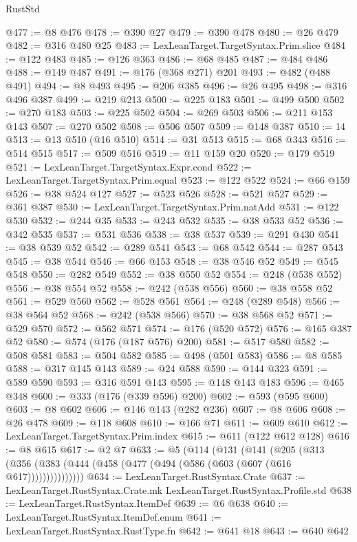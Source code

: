 \begin{lexlean}{RustStd}
\begin{coremodule}
@477 := @8 @476
@478 := @390 @27
@479 := @390 @478
@480 := @26 @479
@482 := @316 @480 @25
@483 := LexLeanTarget.TargetSyntax.Prim.slice
@484 := @122 @483
@485 := @126 @363
@486 := @68 @485
@487 := @484 @486
@488 := @149 @487
@491 := @176 (@368 @271) @201
@493 := @482 (@488 @491)
@494 := @8 @493
@495 := @206 @385
@496 := @26 @495
@498 := @316 @496 @387
@499 := @219 @213
@500 := @225 @183
@501 := @499 @500
@502 := @270 @183
@503 := @225 @502
@504 := @269 @503
@506 := @211 @153 @143
@507 := @270 @502
@508 := @506 @507
@509 := @148 @387
@510 := 14
@513 := @13 @510 (@16 @510)
@514 := @31 @513
@515 := @68 @343
@516 := @514 @515
@517 := @509 @516
@519 := @11 @159 @20
@520 := @179 @519
@521 := LexLeanTarget.TargetSyntax.Expr.cond
@522 := LexLeanTarget.TargetSyntax.Prim.equal
@523 := @122 @522
@524 := @66 @159
@526 := @38 @524 @127
@527 := @523 @526
@528 := @521 @527
@529 := @361 @387
@530 := LexLeanTarget.TargetSyntax.Prim.natAdd
@531 := @122 @530
@532 := @244 @35
@533 := @243 @532
@535 := @38 @533 @52
@536 := @342 @535
@537 := @531 @536
@538 := @38 @537
@539 := @291 @430
@541 := @38 @539 @52
@542 := @289 @541
@543 := @68 @542
@544 := @287 @543
@545 := @38 @544
@546 := @66 @153
@548 := @38 @546 @52
@549 := @545 @548
@550 := @282 @549
@552 := @38 @550 @52
@554 := @248 (@538 @552)
@556 := @38 @554 @52
@558 := @242 (@538 @556)
@560 := @38 @558 @52
@561 := @529 @560
@562 := @528 @561
@564 := @248 (@289 @548)
@566 := @38 @564 @52
@568 := @242 (@538 @566)
@570 := @38 @568 @52
@571 := @529 @570
@572 := @562 @571
@574 := @176 (@520 @572)
@576 := @165 @387 @52
@580 := @574 (@176 (@187 @576) @200)
@581 := @517 @580
@582 := @508 @581
@583 := @504 @582
@585 := @498 (@501 @583)
@586 := @8 @585
@588 := @317 @145 @143
@589 := @24 @588
@590 := @144 @323
@591 := @589 @590
@593 := @316 @591 @143
@595 := @148 @143 @183
@596 := @465 @348
@600 := @333 (@176 (@339 @596) @200)
@602 := @593 (@595 @600)
@603 := @8 @602
@606 := @146 @143 (@282 @236)
@607 := @8 @606
@608 := @26 @478
@609 := @118 @608
@610 := @166 @71
@611 := @609 @610
@612 := LexLeanTarget.TargetSyntax.Prim.index
@615 := @611 (@122 @612 @128)
@616 := @8 @615
@617 := @2 @7
@633 := @5
    (@114
      (@131
        (@141
          (@205
            (@313 (@356 (@383 (@444 (@458 (@477 (@494 (@586 (@603 (@607 (@616 @617)))))))))))))))
@634 := LexLeanTarget.RustSyntax.Crate
@637 := LexLeanTarget.RustSyntax.Crate.mk LexLeanTarget.RustSyntax.Profile.std
@638 := LexLeanTarget.RustSyntax.ItemDef
@639 := @6 @638
@640 := LexLeanTarget.RustSyntax.ItemDef.enum
@641 := LexLeanTarget.RustSyntax.RustType.fn
@642 := @641 @18
@643 := @640 @642

\end{coremodule}
\end{lexlean}
